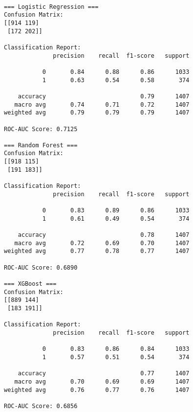\documentclass[11pt]{article}
\begin{document}
    \begin{Verbatim}[commandchars=\\\{\}]

=== Logistic Regression ===
Confusion Matrix:
[[914 119]
 [172 202]]

Classification Report:
              precision    recall  f1-score   support

           0       0.84      0.88      0.86      1033
           1       0.63      0.54      0.58       374

    accuracy                           0.79      1407
   macro avg       0.74      0.71      0.72      1407
weighted avg       0.79      0.79      0.79      1407

ROC-AUC Score: 0.7125

=== Random Forest ===
Confusion Matrix:
[[918 115]
 [191 183]]

Classification Report:
              precision    recall  f1-score   support

           0       0.83      0.89      0.86      1033
           1       0.61      0.49      0.54       374

    accuracy                           0.78      1407
   macro avg       0.72      0.69      0.70      1407
weighted avg       0.77      0.78      0.77      1407

ROC-AUC Score: 0.6890

=== XGBoost ===
Confusion Matrix:
[[889 144]
 [183 191]]

Classification Report:
              precision    recall  f1-score   support

           0       0.83      0.86      0.84      1033
           1       0.57      0.51      0.54       374

    accuracy                           0.77      1407
   macro avg       0.70      0.69      0.69      1407
weighted avg       0.76      0.77      0.76      1407

ROC-AUC Score: 0.6856
    \end{Verbatim}
\end{document}
